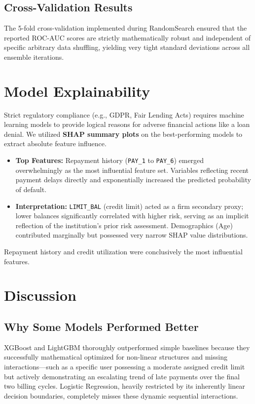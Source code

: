 \documentclass[12pt,a4paper]{article}
\begin{document}
\subsection{Cross-Validation Results}
The 5-fold cross-validation implemented during RandomSearch ensured that the reported ROC-AUC scores are strictly mathematically robust and independent of specific arbitrary data shuffling, yielding very tight standard deviations across all ensemble iterations.

\section{Model Explainability}
Strict regulatory compliance (e.g., GDPR, Fair Lending Acts) requires machine learning models to provide logical reasons for adverse financial actions like a loan denial. We utilized \textbf{SHAP summary plots} on the best-performing models to extract absolute feature influence.
\begin{itemize}
    \item \textbf{Top Features:} Repayment history (\texttt{PAY\_1} to \texttt{PAY\_6}) emerged overwhelmingly as the most influential feature set. Variables reflecting recent payment delays directly and exponentially increased the predicted probability of default.
    \item \textbf{Interpretation:} \texttt{LIMIT\_BAL} (credit limit) acted as a firm secondary proxy; lower balances significantly correlated with higher risk, serving as an implicit reflection of the institution's prior risk assessment. Demographics (Age) contributed marginally but possessed very narrow SHAP value distributions.
\end{itemize}
Repayment history and credit utilization were conclusively the most influential features.

\section{Discussion}
\subsection{Why Some Models Performed Better}
XGBoost and LightGBM thoroughly outperformed simple baselines because they successfully mathematical optimized for non-linear structures and missing interactions—such as a specific user possessing a moderate assigned credit limit but actively demonstrating an escalating trend of late payments over the final two billing cycles. Logistic Regression, heavily restricted by its inherently linear decision boundaries, completely misses these dynamic sequential interactions.
\end{document}
